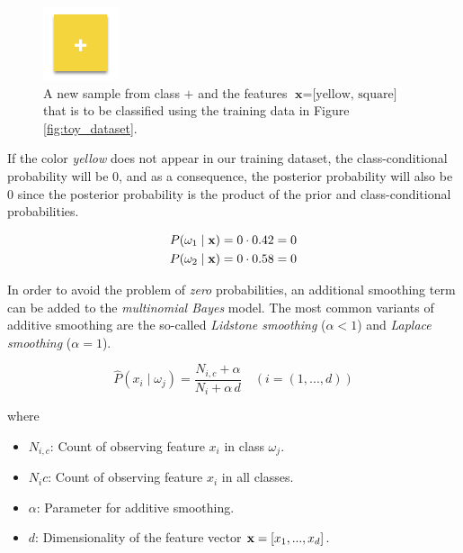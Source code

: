 \documentclass{article}
\begin{document}
 \begin{figure}[h!]
\includegraphics[scale=0.5]{../images/toy_dataset_3.png}
\caption{A new sample from class $+$ and the features $\textbf{x} = \text{[yellow, square]}$ that is to be classified using the training data in Figure \ref{fig:toy_dataset}.}
\label{fig:new_sample2}
\end{figure}


If the color \emph{yellow} does not appear in our training dataset, the class-conditional probability will be 0, and as a consequence, the posterior probability will also be 0 since the posterior probability is the product of the prior and class-conditional probabilities.

\begin{equation} 
\begin{split}
& P(\omega_1 \mid \textbf x) = 0  \cdot  0.42 = 0 \\
& P(\omega_2 \mid \textbf x) = 0  \cdot  0.58 = 0 
\end{split}
\end{equation} 

In order to avoid the problem of \emph{zero} probabilities, an additional smoothing term can be added to the \emph{multinomial Bayes} model. The most common variants of additive smoothing are the so-called \emph{Lidstone smoothing} ($\alpha<1$) and  \emph{Laplace smoothing} ($\alpha=1$).


\begin{equation} \hat{P}(x_i \mid \omega_j) = \frac{N_{i,c}+\alpha}{N_i + \alpha \, d}  \quad (i = (1, ..., d))\end{equation}

where

\begin{itemize}

\item $N_{i,c}$: Count of observing feature $x_i$ in class $\omega_j$.
\item $N_ic$: Count of observing feature $x_i$ in all classes.
\item $\alpha$: Parameter for additive smoothing. 
\item $d$: Dimensionality of the feature vector $\textbf x = [x_1, ..., x_d]$.

\end{itemize}
\end{document}
